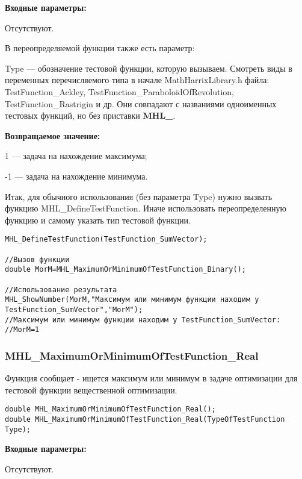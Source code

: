 \documentclass[a4paper,12pt]{article}
\begin{document}
\textbf{Входные параметры:}

Отсутствуют.

В переопределяемой функции также есть параметр:
  
Type --- обозначение тестовой функции, которую вызываем.
Смотреть виды в переменных перечисляемого типа в начале MathHarrixLibrary.h файла: TestFunction\_Ackley, TestFunction\_ParaboloidOfRevolution, TestFunction\_Rastrigin и др. Они совпадают с названиями одноименных тестовых функций, но без приставки \textbf{MHL\_}.

\textbf{Возвращаемое значение:}
 
1 --- задача на нахождение максимума;

-1 --- задача на нахождение минимума.

Итак, для обычного использования (без параметра Type) нужно вызвать функцию MHL\_DefineTestFunction. Иначе использовать переопределенную функцию и самому указать тип тестовой функции.


\begin{lstlisting}[label=code_use_MHL_MaximumOrMinimumOfTestFunction_Binary,caption=Пример использования]
MHL_DefineTestFunction(TestFunction_SumVector);

//Вызов функции
double MorM=MHL_MaximumOrMinimumOfTestFunction_Binary();

//Использование результата
MHL_ShowNumber(MorM,"Максимум или минимум функции находим у TestFunction_SumVector","MorM");
//Максимум или минимум функции находим у TestFunction_SumVector:
//MorM=1
\end{lstlisting}

\subsubsection{MHL\_MaximumOrMinimumOfTestFunction\_Real}\label{MHL_MaximumOrMinimumOfTestFunction_Real}

	Функция сообщает - ищется максимум или минимум в задаче оптимизации для тестовой функции вещественной оптимизации.


\begin{lstlisting}[label=code_syntax_MHL_MaximumOrMinimumOfTestFunction_Real,caption=Синтаксис]
double MHL_MaximumOrMinimumOfTestFunction_Real();
double MHL_MaximumOrMinimumOfTestFunction_Real(TypeOfTestFunction Type);
\end{lstlisting}

\textbf{Входные параметры:}

Отсутствуют.
\end{document}
